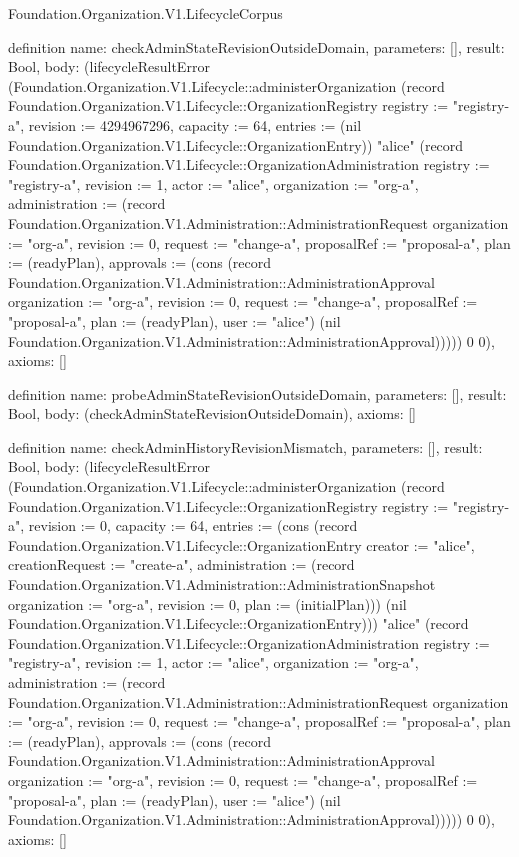 \begin{lexlean}{Foundation.Organization.V1.LifecycleCorpus}
\begin{semanticmodule}
definition{
  name: checkAdminStateRevisionOutsideDomain,
  parameters: [],
  result: Bool,
  body: (lifecycleResultError (Foundation.Organization.V1.Lifecycle::administerOrganization (record Foundation.Organization.V1.Lifecycle::OrganizationRegistry {registry := "registry-a", revision := 4294967296, capacity := 64, entries := (nil Foundation.Organization.V1.Lifecycle::OrganizationEntry)}) "alice" (record Foundation.Organization.V1.Lifecycle::OrganizationAdministration {registry := "registry-a", revision := 1, actor := "alice", organization := "org-a", administration := (record Foundation.Organization.V1.Administration::AdministrationRequest {organization := "org-a", revision := 0, request := "change-a", proposalRef := "proposal-a", plan := (readyPlan), approvals := (cons (record Foundation.Organization.V1.Administration::AdministrationApproval {organization := "org-a", revision := 0, request := "change-a", proposalRef := "proposal-a", plan := (readyPlan), user := "alice"}) (nil Foundation.Organization.V1.Administration::AdministrationApproval))})})) 0 0),
  axioms: []
}

definition{
  name: probeAdminStateRevisionOutsideDomain,
  parameters: [],
  result: Bool,
  body: (checkAdminStateRevisionOutsideDomain),
  axioms: []
}

definition{
  name: checkAdminHistoryRevisionMismatch,
  parameters: [],
  result: Bool,
  body: (lifecycleResultError (Foundation.Organization.V1.Lifecycle::administerOrganization (record Foundation.Organization.V1.Lifecycle::OrganizationRegistry {registry := "registry-a", revision := 0, capacity := 64, entries := (cons (record Foundation.Organization.V1.Lifecycle::OrganizationEntry {creator := "alice", creationRequest := "create-a", administration := (record Foundation.Organization.V1.Administration::AdministrationSnapshot {organization := "org-a", revision := 0, plan := (initialPlan)})}) (nil Foundation.Organization.V1.Lifecycle::OrganizationEntry))}) "alice" (record Foundation.Organization.V1.Lifecycle::OrganizationAdministration {registry := "registry-a", revision := 1, actor := "alice", organization := "org-a", administration := (record Foundation.Organization.V1.Administration::AdministrationRequest {organization := "org-a", revision := 0, request := "change-a", proposalRef := "proposal-a", plan := (readyPlan), approvals := (cons (record Foundation.Organization.V1.Administration::AdministrationApproval {organization := "org-a", revision := 0, request := "change-a", proposalRef := "proposal-a", plan := (readyPlan), user := "alice"}) (nil Foundation.Organization.V1.Administration::AdministrationApproval))})})) 0 0),
  axioms: []
}


\end{semanticmodule}
\end{lexlean}
